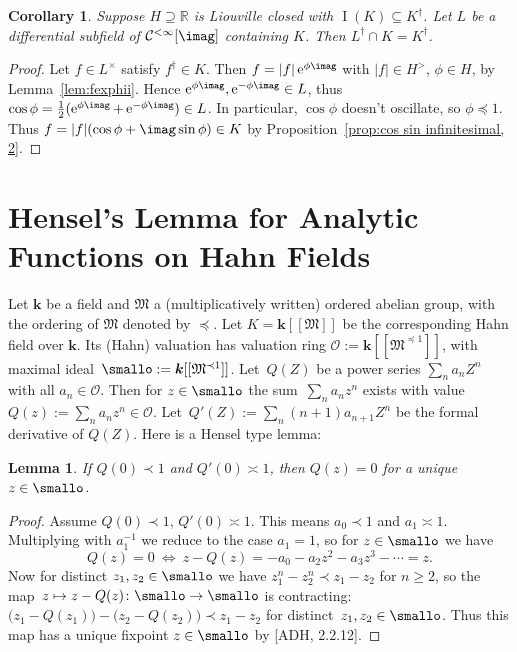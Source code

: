 \documentclass[]{amsart}
\numberwithin{equation}{section}
\newcommand{\bbold}{\mathbb}
\def\R { {\bbold R} }
\def \I{\operatorname{I}}
\def \ex{\operatorname{e}}
\def \k {{{\boldsymbol{k}}}}
\newtheorem{lemma}[theorem]{Lemma}
\newtheorem{cor}[theorem]{Corollary}
\theoremstyle{definition}
\theoremstyle{remark}
\newcommand{\abs}[1]{\lvert#1\rvert}
\def \fM {{\mathfrak M}}
\renewcommand\geq{\geqslant}
\renewcommand\preceq{\preccurlyeq}
\renewcommand\ge{\geq}
\def \Calinf{\mathcal{C}^{<\infty}}
\begin{document}
\begin{cor}\label{cor:fexphii}
Suppose $H\supseteq\R$ is Liouville closed with $\I(K)\subseteq K^\dagger$. Let $L$ be a differential subfield of $\Calinf[\imag]$ containing $K$.
Then $L^\dagger \cap K = K^\dagger$.
\end{cor}
\begin{proof}
Let $f\in L^\times$ satisfy $f^\dagger \in K$. Then $f=\abs{f}\ex^{\phi\imag}$ with $\abs{f}\in H^>$, $\phi\in H$,
by Lem\-ma~\ref{lem:fexphii}. Hence $\ex^{\phi\imag}, \ex^{-\phi\imag}\in L$, thus
$\cos \phi = \frac{1}{2}(\ex^{\phi\imag}+\ex^{-\phi\imag})\in L$. In particular, $\cos \phi$ doesn't oscillate, so $\phi\preceq 1$. Thus $f=|f|(\cos \phi + \imag \sin \phi)\in K$ by Proposition~\ref{prop:cos sin infinitesimal, 2}.
\end{proof}

   
 
\section{Hensel's Lemma for Analytic Functions on Hahn Fields}\label{sec:hens}

\noindent
Let $\k$ be a field and $\fM$ a (multiplicatively written) ordered abelian group, with the ordering of $\fM$ denoted by $\preceq$.  
Let $K=\k[[\fM]]$ be the corresponding Hahn field over $\k$. Its (Hahn) valuation has valuation ring $\mathcal{O}:=\k[[\fM^{\preceq 1}]]$, with
maximal ideal~$\smallo:=\k[[\fM^{\prec 1}]]$. 
Let~$Q(Z)$ be a power series $\sum_n a_nZ^n$ with all $a_n\in \mathcal{O}$. Then for $z\in \smallo$  the sum~$\sum_n a_nz^n$ exists with value $Q(z):=\sum_n a_nz^n\in \mathcal{O}$. Let~$Q'(Z):=\sum_n ({n+1})a_{n+1}Z^n$ be the formal derivative of $Q(Z)$.  Here is a Hensel type lemma: 

\begin{lemma}\label{lem:hens}
If $Q(0)\prec 1$ and $Q'(0)\asymp 1$, then $Q(z)=0$ for a unique $z\in \smallo$.
\end{lemma}

\begin{proof} Assume $Q(0)\prec 1$, $Q'(0)\asymp 1$. This means $a_0\prec  1$ and $a_1\asymp 1$. Multiplying with $a_1^{-1}$ we reduce to the case $a_1=1$,  so for $z\in \smallo$ we have
$$Q(z)=0\ \Longleftrightarrow\ z-Q(z)=-a_0-a_2z^2-a_3z^3- \cdots= z.$$ Now for distinct $z_1, z_2\in \smallo$ we have
$z_1^n-z_2^n\prec z_1-z_2$ for $n\ge 2$, so the map~$z\mapsto {z-Q(z)}\colon \smallo \to\smallo$ is contracting:
$\big(z_1-Q(z_1)\big)-\big(z_2-Q(z_2)\big) \prec z_1-z_2$ for distinct~${z_1, z_2\in \smallo}$. Thus this  map has a unique fixpoint  $z\in \smallo$ by [ADH, 2.2.12]. %
\end{proof}
\end{document}
